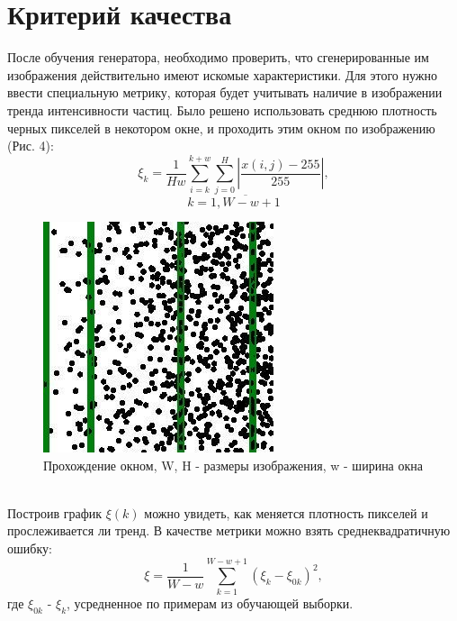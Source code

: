 \documentclass[a4paper]{article}
\begin{document}
	\section{Критерий качества}
		После обучения генератора, необходимо проверить, что сгенерированные им изображения действительно имеют искомые характеристики. Для этого нужно ввести специальную метрику, которая будет учитывать наличие в изображении тренда интенсивности частиц. Было решено использовать среднюю плотность черных пикселей в некотором окне, и проходить этим окном по изображению (Рис. 4):
		$$\xi_k = \frac{1}{H w}{\sum_{i=k}^{k+w} \sum_{j=0}^{H}\left| \frac{x(i, j) - 255}{255} \right|}, $$$$k = \overline{1, W - w + 1} $$
		\begin{figure}[h!]
			\begin{center}
				\includegraphics[width=0.35\linewidth]{metrics}
			\end{center}
			\caption{Прохождение окном, W, H - размеры изображения, w - ширина окна}
		\end{figure}
		\\
		Построив график $\xi(k)$ можно увидеть, как меняется плотность пикселей и прослеживается ли тренд. В качестве метрики можно взять среднеквадратичную ошибку:
		$$ \xi = \frac{1}{W-w}\sum_{k=1}^{W-w+1} (\xi_k - \xi_{0k})^2,$$
		где $\xi_{0k}$ - $\xi_k$, усредненное по примерам из обучающей выборки.
\end{document}
